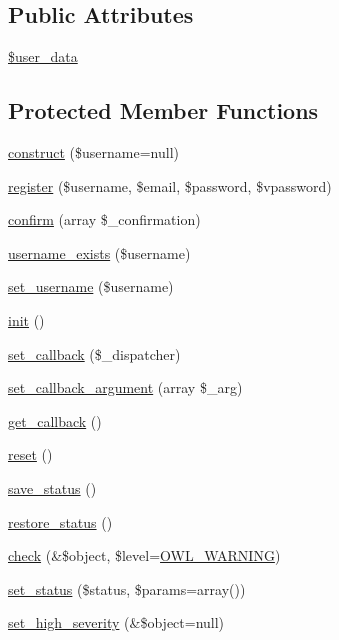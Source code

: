 \subsection*{Public Attributes}
\begin{DoxyCompactItemize}
\item 
\hyperlink{classUserHandler_ae7a2d59eee65560ac96b860e828bb445}{\$user\_\-data}
\end{DoxyCompactItemize}
\subsection*{Protected Member Functions}
\begin{DoxyCompactItemize}
\item 
\hyperlink{classUser_a9cf024c7e3148e45afd1bee7691ceefd}{construct} (\$username=null)
\item 
\hyperlink{classUser_ac262f6dc9d3a121c25045fe6716e014a}{register} (\$username, \$email, \$password, \$vpassword)
\item 
\hyperlink{classUser_acbcc13f994e50ee3f562e9949f6d0638}{confirm} (array \$\_\-confirmation)
\item 
\hyperlink{classUserHandler_a4b50cc703608c490080b25c5b2ae3418}{username\_\-exists} (\$username)
\item 
\hyperlink{classUserHandler_afbcc9a275b547cca0bd4cff567b054a0}{set\_\-username} (\$username)
\item 
\hyperlink{class__OWL_ae0ef3ded56e8a6b34b6461e5a721cd3e}{init} ()
\item 
\hyperlink{class__OWL_a28d9025eaf37b49d63cb334ed28c33f0}{set\_\-callback} (\$\_\-dispatcher)
\item 
\hyperlink{class__OWL_a1e26611ce858b237f5a98a91ea3c3a1b}{set\_\-callback\_\-argument} (array \$\_\-arg)
\item 
\hyperlink{class__OWL_abded13b1c97ea6e0cfe3c68cb6bcf7a5}{get\_\-callback} ()
\item 
\hyperlink{class__OWL_a2f2a042bcf31965194c03033df0edc9b}{reset} ()
\item 
\hyperlink{class__OWL_a9e49b9c76fbc021b244c6915ea536d71}{save\_\-status} ()
\item 
\hyperlink{class__OWL_a465eeaf40edd9f9c848841700c32ce55}{restore\_\-status} ()
\item 
\hyperlink{class__OWL_ae2e3c56e5f3c4ce4156c6b1bb1c50f63}{check} (\&\$object, \$level=\hyperlink{owl_8severitycodes_8php_ace886152e2e86cd2e91cb833fd495adb}{OWL\_\-WARNING})
\item 
\hyperlink{class__OWL_aea912d0ede9b3c2a69b79072d94d4787}{set\_\-status} (\$status, \$params=array())
\item 
\hyperlink{class__OWL_a576829692a3b66e3d518853bf43abae3}{set\_\-high\_\-severity} (\&\$object=null)
\end{DoxyCompactItemize}
